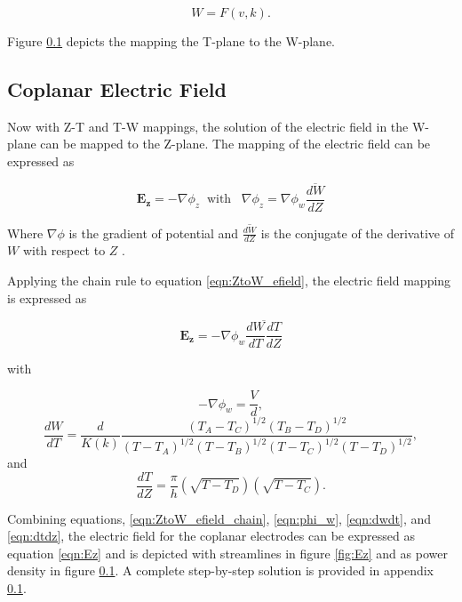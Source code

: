 \begin{equation}
    W = F(v,k).
\end{equation}

\noindent Figure \ref{} depicts the mapping the T-plane to the W-plane. 

\subsection{Coplanar Electric Field}

 \par Now with Z-T and T-W mappings, the solution of the electric field in the W-plane can be mapped to the Z-plane. The mapping of the electric field can be expressed as 
 
 \begin{equation}
     \boldsymbol{E_z} = -\nabla \phi_z \;\;\text{with} \;\;\;\nabla \phi_z = \nabla \phi_w \overline{\frac{dW}{dZ}}
     \label{eqn:ZtoW_efield}
 \end{equation}
 
 \noindent Where $\nabla \phi$ is the gradient of potential and $\overline{\frac{dW}{dZ}}$ is the conjugate of the derivative of $W$ with respect to $Z$ \cite{schinzinger_conformal_2012}.
 
 \par Applying the chain rule to equation \ref{eqn:ZtoW_efield}, the electric field mapping is expressed as
 
 \begin{equation}
    \boldsymbol{E_z} =- \nabla \phi_w \overline{\frac{dW}{dT}\frac{dT}{dZ}}
    \label{eqn:ZtoW_efield_chain}
 \end{equation}
 
\noindent with 

 \begin{equation}
     -\nabla \phi_w = \frac{V}{d},
     \label{eqn:phi_w}
 \end{equation}
 \begin{equation}
     \frac{dW}{dT} = \frac{d}{K(k)}\frac{(T_A - T_C)^{1/2}(T_B-T_D)^{1/2}}{(T-T_A)^{1/2}(T-T_B)^{1/2}(T-T_C)^{1/2}(T-T_D)^{1/2}},
     \label{eqn:dwdt}
 \end{equation}
 \noindent and
 \begin{equation}
     \frac{dT}{dZ} = \frac{\pi}{h}(\sqrt{T-T_D})(\sqrt{T-T_C}).
     \label{eqn:dtdz}
 \end{equation}
 
 \par Combining equations, \ref{eqn:ZtoW_efield_chain}, \ref{eqn:phi_w}, \ref{eqn:dwdt}, and \ref{eqn:dtdz}, the electric field for the coplanar electrodes can be expressed as equation \ref{eqn:Ez} and is depicted with streamlines in figure \ref{fig:Ez} and as power density in figure \ref{}. A complete step-by-step solution is provided in appendix \ref{}.
 
